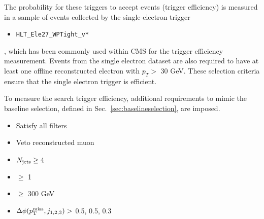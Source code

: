 The probability for these triggers to accept events (trigger efficiency) is measured in a sample of events collected by the single-electron trigger
\begin{itemize}
  \item \texttt{HLT\_Ele27\_WPTight\_v*}
\end{itemize}
, which has been commonly used within CMS for the \MET trigger efficiency measurement. Events from the single electron dataset are also required to have at least one offline reconstructed electron with $p_{T}>$ 30 GeV. These selection criteria ensure that the single electron trigger is efficient. 

To measure the search trigger efficiency, additional requirements to mimic the baseline selection, defined in Sec.~\ref{sec:baselineselection}, are imposed.
\begin{itemize}
  \item Satisfy all filters
  \item Veto reconstructed muon
  \item $N_{\text{jets}}\geq4$
  \item \nbjets $\ge$ 1
  \item \HT $\ge$ 300 GeV
  \item $\Delta\phi(p^{\rm miss}_{\rm T}, j_{1,2,3})>$ 0.5, 0.5, 0.3
\end{itemize}

